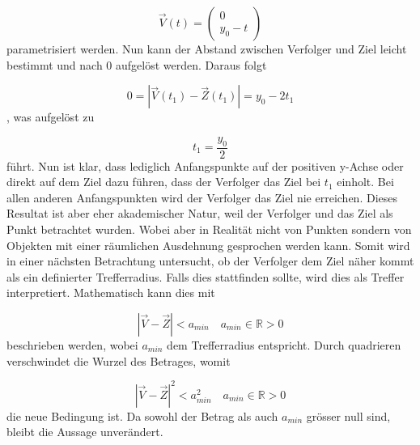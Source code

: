 \begin{equation}
    \vec{V}(t)
    =
    \left( \begin{array}{c} 0 \\ y_0-t \end{array} \right)
\end{equation}
%
parametrisiert werden.
Nun kann der Abstand zwischen Verfolger und Ziel leicht bestimmt und nach 0 aufgelöst werden.
Daraus folgt

\begin{equation}
    0
    =
    |\vec{V}(t_1)-\vec{Z}(t_1)|
    =
    y_0-2t_1
\end{equation}
%
, was aufgelöst zu

\begin{equation}
    t_1
    =
    \frac{y_0}{2}
\end{equation}
%
führt.
Nun ist klar, dass lediglich Anfangspunkte auf der positiven y-Achse oder direkt auf dem Ziel dazu führen, dass der Verfolger das Ziel bei $t_1$ einholt.
Bei allen anderen Anfangspunkten wird der Verfolger das Ziel nie erreichen.
Dieses Resultat ist aber eher akademischer Natur, weil der Verfolger und das Ziel als Punkt betrachtet wurden.
Wobei aber in Realität nicht von Punkten sondern von Objekten mit einer räumlichen Ausdehnung gesprochen werden kann.
Somit wird in einer nächsten Betrachtung untersucht, ob der Verfolger dem Ziel näher kommt als ein definierter Trefferradius.
Falls dies stattfinden sollte, wird dies als Treffer interpretiert.
Mathematisch kann dies mit

\begin{equation}
    |\vec{V}-\vec{Z}|<a_{min} \quad a_{min}\in\mathbb{R}>0
\end{equation}
%
beschrieben werden, wobei $a_{min}$ dem Trefferradius entspricht.
Durch quadrieren verschwindet die Wurzel des Betrages, womit

\begin{equation}
    |\vec{V}-\vec{Z}|^2<a_{min}^2 \quad a_{min}\in \mathbb{R} > 0
\end{equation}
%
die neue Bedingung ist.
Da sowohl der Betrag als auch $a_{min}$ grösser null sind, bleibt die Aussage unverändert.



